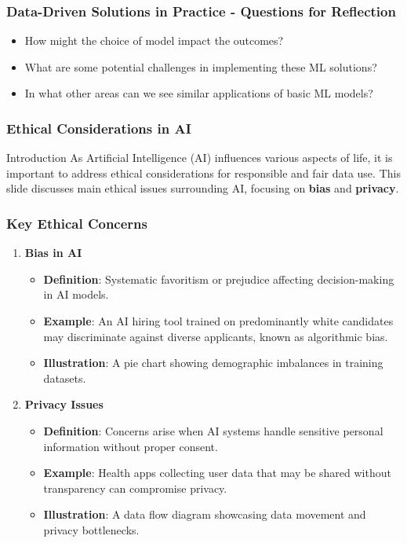 \documentclass[aspectratio=169]{beamer}
\begin{document}
\begin{frame}[fragile]
    \frametitle{Data-Driven Solutions in Practice - Questions for Reflection}
    \begin{itemize}
        \item How might the choice of model impact the outcomes?
        \item What are some potential challenges in implementing these ML solutions?
        \item In what other areas can we see similar applications of basic ML models?
    \end{itemize}
\end{frame}

\begin{frame}[fragile]
    \frametitle{Ethical Considerations in AI}
    \begin{block}{Introduction}
        As Artificial Intelligence (AI) influences various aspects of life, it is important to address ethical considerations for responsible and fair data use. This slide discusses main ethical issues surrounding AI, focusing on \textbf{bias} and \textbf{privacy}.
    \end{block}
\end{frame}

\begin{frame}[fragile]
    \frametitle{Key Ethical Concerns}
    \begin{enumerate}
        \item \textbf{Bias in AI}
        \begin{itemize}
            \item \textbf{Definition}: Systematic favoritism or prejudice affecting decision-making in AI models.
            \item \textbf{Example}: An AI hiring tool trained on predominantly white candidates may discriminate against diverse applicants, known as algorithmic bias.
            \item \textbf{Illustration}: A pie chart showing demographic imbalances in training datasets.
        \end{itemize}
        
        \item \textbf{Privacy Issues}
        \begin{itemize}
            \item \textbf{Definition}: Concerns arise when AI systems handle sensitive personal information without proper consent.
            \item \textbf{Example}: Health apps collecting user data that may be shared without transparency can compromise privacy.
            \item \textbf{Illustration}: A data flow diagram showcasing data movement and privacy bottlenecks.
        \end{itemize}
    \end{enumerate}
\end{frame}
\end{document}
